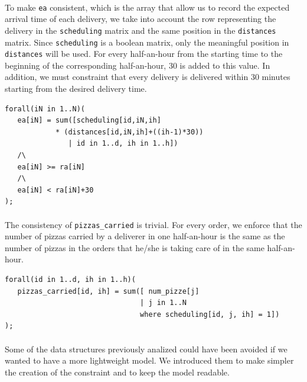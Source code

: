\documentclass[10pt]{article}
\begin{document}
	\paragraph*{}
	To make \texttt{ea} consistent, which is the array that allow us to record the expected arrival
	time of each delivery, we take into account the row representing the delivery in the 
	\texttt{scheduling} matrix and the same position in the \texttt{distances} matrix. Since 
	\texttt{scheduling} is a boolean matrix, only the meaningful position in 
	\texttt{distances} will be used. For every half-an-hour from the starting time to the 
	beginning of the corresponding half-an-hour, 30 is added to this value. 
	In addition, we must constraint that every delivery is delivered within 
	30 minutes starting from the desired delivery time.
	\begin{verbatim}
forall(iN in 1..N)(
   ea[iN] = sum([scheduling[id,iN,ih]
            * (distances[id,iN,ih]+((ih-1)*30)) 
               | id in 1..d, ih in 1..h])
   /\
   ea[iN] >= ra[iN] 
   /\ 
   ea[iN] < ra[iN]+30 
);
	\end{verbatim}


	\paragraph*{}
	The consistency of \texttt{pizzas\_carried} is trivial. For every order, we enforce that the 
	number of pizzas carried by a deliverer in one half-an-hour is the same as the number of 
	pizzas in the orders that he/she is taking care of in the same half-an-hour.
	\begin{verbatim}
forall(id in 1..d, ih in 1..h)(
   pizzas_carried[id, ih] = sum([ num_pizze[j]
                                | j in 1..N 
                                where scheduling[id, j, ih] = 1])
);
	\end{verbatim}

	\paragraph*{}
	Some of the data structures previously analized could have been avoided if we 
	wanted to have a more lightweight model. We introduced them to make simpler the
	creation of the constraint and to keep the model readable.
	
\end{document}
